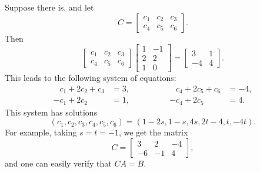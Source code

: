 \begin{solution}
  Suppose there is, and let
  \begin{equation*}
    C =
    \begin{bmatrix}
      c_1 & c_2 & c_3 \\
      c_4 & c_5 & c_6
    \end{bmatrix}.
  \end{equation*}
  Then
  \begin{equation*}
    \begin{bmatrix}
      c_1 & c_2 & c_3 \\
      c_4 & c_5 & c_6
    \end{bmatrix}
    \begin{bmatrix}
      1 & -1 \\
      2 & 2 \\
      1 & 0
    \end{bmatrix}
    =
    \begin{bmatrix}
      3 & 1 \\
      -4 & 4
    \end{bmatrix}.
  \end{equation*}
  This leads to the following system of equations:
  \begin{equation*}
    \begin{split}
      \phantom{-{}}c_1 + 2c_2 + c_3 &= 3, \\
      -c_1 + 2c_2 \phantom{{}+c_3} &= 1,
    \end{split}
    \qquad\qquad
    \begin{split}
      \phantom{-{}}c_4 + 2c_5 + c_6 &= -4, \\
      -c_4 + 2c_5 \phantom{{}+c_6} &= 4.
    \end{split}
  \end{equation*}
  This system has solutions
  \begin{equation*}
    (c_1,c_2,c_3,c_4,c_5,c_6) =
    (1 - 2s, 1 - s, 4s, 2t - 4, t, -4t).
  \end{equation*}
  For example, taking $s = t = -1$, we get the matrix
  \begin{equation*}
    C =
    \begin{bmatrix}
      3 & 2 & -4 \\
      -6 & -1 & 4
    \end{bmatrix},
  \end{equation*}
  and one can easily verify that $CA = B$.
\end{solution}
